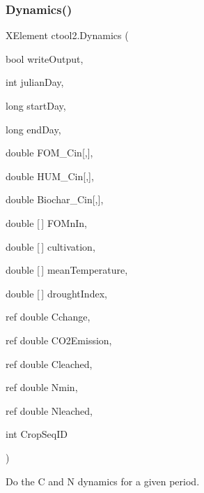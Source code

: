 \subsubsection{\texorpdfstring{Dynamics()}{Dynamics()}}
{\footnotesize\ttfamily X\+Element ctool2.\+Dynamics (\begin{DoxyParamCaption}\item[{bool}]{write\+Output,  }\item[{int}]{julian\+Day,  }\item[{long}]{start\+Day,  }\item[{long}]{end\+Day,  }\item[{double}]{F\+O\+M\+\_\+\+Cin\mbox{[},\mbox{]},  }\item[{double}]{H\+U\+M\+\_\+\+Cin\mbox{[},\mbox{]},  }\item[{double}]{Biochar\+\_\+\+Cin\mbox{[},\mbox{]},  }\item[{double \mbox{[}$\,$\mbox{]}}]{F\+O\+Mn\+In,  }\item[{double \mbox{[}$\,$\mbox{]}}]{cultivation,  }\item[{double \mbox{[}$\,$\mbox{]}}]{mean\+Temperature,  }\item[{double \mbox{[}$\,$\mbox{]}}]{drought\+Index,  }\item[{ref double}]{Cchange,  }\item[{ref double}]{C\+O2\+Emission,  }\item[{ref double}]{Cleached,  }\item[{ref double}]{Nmin,  }\item[{ref double}]{Nleached,  }\item[{int}]{Crop\+Seq\+ID }\end{DoxyParamCaption})\hspace{0.3cm}{\ttfamily [inline]}}



Do the C and N dynamics for a given period. 



